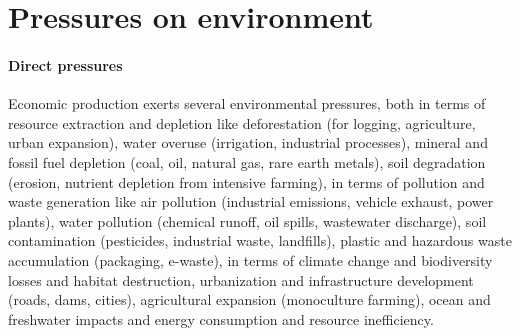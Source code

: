 \documentclass{article}
\begin{document}

\section{Pressures on environment}
\label{appendix:environmental_pressures}

\paragraph{Direct pressures} Economic production exerts several environmental pressures, both in terms of resource extraction and depletion like deforestation (for logging, agriculture, urban expansion), water overuse (irrigation, industrial processes), mineral and fossil fuel depletion (coal, oil, natural gas, rare earth metals), soil degradation (erosion, nutrient depletion from intensive farming), in terms of pollution and waste generation like air pollution (industrial emissions, vehicle exhaust, power plants), water pollution (chemical runoff, oil spills, wastewater discharge), soil contamination (pesticides, industrial waste, landfills), plastic and hazardous waste accumulation (packaging, e-waste), in terms of climate change and biodiversity losses and habitat destruction, urbanization and infrastructure development (roads, dams, cities), agricultural expansion (monoculture farming), ocean and freshwater impacts and energy consumption and resource inefficiency.
\end{document}
